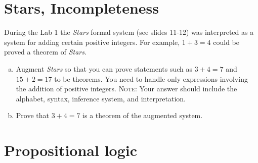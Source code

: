 \documentclass[11pt]{article}
\begin{document}
\section{Stars, Incompleteness}
During the Lab 1 the {\em Stars} formal system (see slides 11-12) was interpreted as a system for adding certain positive integers. For example, $1 + 3 = 4$ could be proved a theorem of {\em Stars}.

\begin{enumerate}[(a)]
 \item Augment {\em Stars} so that you can prove statements such as $3+4=7$ and $15 + 2 = 17$ to be theorems.
 You need to handle only expressions involving the addition of positive integers.
 \textsc{Note:} Your answer should include the alphabet, syntax, inference system, and interpretation.

 \item Prove that $3 + 4 = 7$ is a theorem of the augmented system.
\end{enumerate}

\section{Propositional logic}
\end{document}
